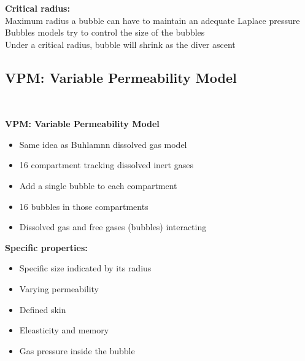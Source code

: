 \documentclass[aspectratio=1610,english,14pt]{beamer}
\begin{document}
\begin{frame}{\insertsubsection}
	\textbf{Critical radius:}\\ 
	Maximum radius a bubble can have to maintain an adequate Laplace pressure\\
	\pause\vfill
	Bubbles models try to control the size of the bubbles\\
	\pause\vfill
	Under a critical radius, bubble will shrink as the diver ascent
\end{frame}

\subsection{VPM: Variable Permeability Model}
	\begin{frame}
		\resizebox{!}{18pt}{\strut\textbf{\insertsubsection}\strut}\\
		\vfill
   \end{frame}

\begin{frame}{\insertsubsection}  
	\textbf{VPM: Variable Permeability Model}
	\begin{itemize}
		\item Same idea as Buhlamnn dissolved gas model 
		\item 16 compartment tracking dissolved inert gases
	 	\item Add a single bubble to each compartment
		\item 16 bubbles in those compartments
		\item Dissolved gas and free gases (bubbles) interacting
	 \end{itemize}
\end{frame}

\begin{frame}{\insertsubsection}  
	\textbf{Specific properties:}
	\begin{itemize}
		\item Specific size indicated by its radius
		\item Varying permeability
		\item Defined skin
		\item Eleasticity and memory
		\item Gas pressure inside the bubble
	\end{itemize}	
\end{frame}
\end{document}
